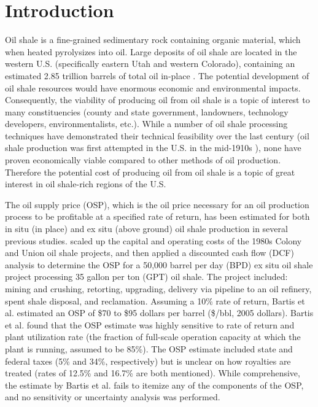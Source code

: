 \documentclass[preprint, authoryear]{elsarticle}
\begin{document}

\linenumbers

\section{Introduction}

Oil shale is a fine-grained sedimentary rock containing organic material, which when heated pyrolysizes into oil. Large deposits of oil shale are located in the western U.S. (specifically eastern Utah and western Colorado), containing an estimated 2.85 trillion barrels of total oil in-place \citep{U.S.GeologicalSurveyOilShaleAssessmentTeam2010a, U.S.GeologicalSurveyOilShaleAssessmentTeam2010}. The potential development of oil shale resources would have enormous economic and environmental impacts. Consequently, the viability of producing oil from oil shale is a topic of interest to many constituencies (county and state government, landowners, technology developers, environmentalists, etc.). While a number of oil shale processing techniques have demonstrated their technical feasibility over the last century (oil shale production was first attempted in the U.S. in the mid-1910s \citep{EPAOilShaleWorkGroup1979}), none have proven economically viable compared to other methods of oil production. Therefore the potential cost of producing oil from oil shale is a topic of great interest in oil shale-rich regions of the U.S.

The oil supply price (OSP), which is the oil price necessary for an oil production process to be profitable at a specified rate of return, has been estimated for both in situ (in place) and ex situ (above ground) oil shale production in several previous studies. \cite{Bartis2005} scaled up the capital and operating costs of the 1980s Colony \citep{Harney1983} and Union \citep{Albulescu1987} oil shale projects, and then applied a discounted cash flow (DCF) analysis to determine the OSP for a 50,000 barrel per day (BPD) ex situ oil shale project processing 35 gallon per ton (GPT) oil shale. The project included: mining and crushing, retorting, upgrading, delivery via pipeline to an oil refinery, spent shale disposal, and reclamation. Assuming a 10\% rate of return, Bartis et al. estimated an OSP of \$70 to \$95 dollars per barrel (\$/bbl, 2005 dollars). Bartis et al. found that the OSP estimate was highly sensitive to rate of return and plant utilization rate (the fraction of full-scale operation capacity at which the plant is running, assumed to be 85\%). The OSP estimate included state and federal taxes (5\% and 34\%, respectively) but is unclear on how royalties are treated (rates of 12.5\% and 16.7\% are both mentioned). While comprehensive, the estimate by Bartis et al. fails to itemize any of the components of the OSP, and no sensitivity or uncertainty analysis was performed.
\end{document}
